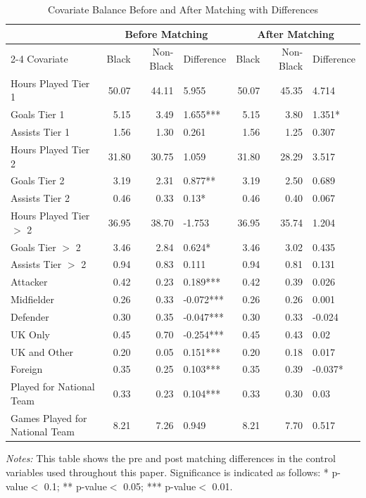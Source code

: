 \begin{table}[!h]
\centering
\caption{Covariate Balance Before and After Matching with Differences} 
\label{tab:balance}
\footnotesize

\begin{threeparttable}
\begin{tabular}{lrrlrrl}
  \toprule
  & \multicolumn{3}{c}{Before Matching} & \multicolumn{3}{c}{After Matching}\\
  \cline{2-4} \cline{5-7}
Covariate & Black & Non-Black & Difference & Black & Non-Black & Difference \\ 
  \midrule
  Hours Played Tier 1 & 50.07 & 44.11 & 5.955 & 50.07 & 45.35 & 4.714 \\ 
  Goals Tier 1 & 5.15 & 3.49 & 1.655*** & 5.15 & 3.80 & 1.351* \\ 
  Assists Tier 1 & 1.56 & 1.30 & 0.261 & 1.56 & 1.25 & 0.307 \\ 
  Hours Played Tier 2 & 31.80 & 30.75 & 1.059 & 31.80 & 28.29 & 3.517 \\ 
  Goals Tier 2 & 3.19 & 2.31 & 0.877** & 3.19 & 2.50 & 0.689 \\ 
  Assists Tier 2 & 0.46 & 0.33 & 0.13* & 0.46 & 0.40 & 0.067 \\ 
  Hours Played Tier $>$ 2 & 36.95 & 38.70 & -1.753 & 36.95 & 35.74 & 1.204 \\ 
  Goals Tier $>$ 2 & 3.46 & 2.84 & 0.624* & 3.46 & 3.02 & 0.435 \\ 
  Assists Tier $>$ 2 & 0.94 & 0.83 & 0.111 & 0.94 & 0.81 & 0.131 \\ 
  Attacker & 0.42 & 0.23 & 0.189*** & 0.42 & 0.39 & 0.026 \\ 
  Midfielder & 0.26 & 0.33 & -0.072*** & 0.26 & 0.26 & 0.001 \\ 
  Defender & 0.30 & 0.35 & -0.047*** & 0.30 & 0.33 & -0.024 \\ 
  UK Only & 0.45 & 0.70 & -0.254*** & 0.45 & 0.43 & 0.02 \\ 
  UK and Other & 0.20 & 0.05 & 0.151*** & 0.20 & 0.18 & 0.017 \\ 
  Foreign & 0.35 & 0.25 & 0.103*** & 0.35 & 0.39 & -0.037* \\ 
  Played for National Team & 0.33 & 0.23 & 0.104*** & 0.33 & 0.30 & 0.03 \\ 
  Games Played for National Team & 8.21 & 7.26 & 0.949 & 8.21 & 7.70 & 0.517 \\ 
   \bottomrule
\end{tabular}
	\begin{tablenotes}[flushleft]
		\item[] \scriptsize \textit{Notes:} This table shows the pre and post matching differences in the control variables used throughout this paper. Significance is indicated as follows: * p-value\(<\) 0.1; ** p-value\(<\) 0.05; *** p-value\(<\) 0.01.
		\end{tablenotes}
  \end{threeparttable}
  
\end{table}
